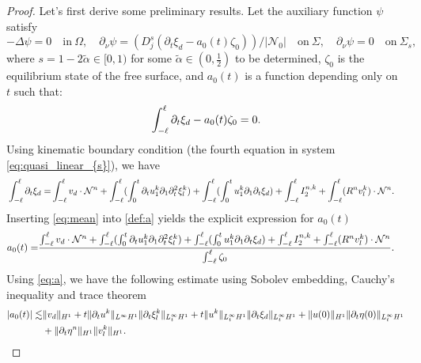 \documentclass[letterpaper,reqno,10pt,twoside]{amsart}
\theoremstyle{definition}
\theoremstyle{remark}
\def\p{\partial}
\def\no{\nonumber}
\def\Om{\Omega}
\begin{document}
\begin{proof}
		Let's first derive some preliminary results. Let the auxiliary function $\psi$ satisfy
		\begin{equation}\label{def:psi}
			-\Delta\psi=0 \quad \text{in} \ \Om,\quad \p_{\nu}\psi=(D_j^s(\partial_{t}\xi_{d}-a_{0}(t)\zeta_{0}))/|\mathcal{N}_0| \quad \text{on} \ \Sigma,\quad \p_{\nu}\psi=0 \quad \text{on} \ \Sigma_s,
		\end{equation}
		where $s=1-2\tilde{\alpha}\in [0,1)$ for some $\tilde{\alpha}\in (0,\frac{1}{2})$ to be determined, 
		$\zeta_{0}$ is the equilibrium state of the free surface, and $a_{0}(t)$ is a function depending only on $t$ such that:
		\begin{align}{\label{def:a}}
			\int_{-\ell}^{\ell} \p_{t}\xi_{d}- a_{0}(t)\zeta_{0} =0.
		\end{align}
		\noindent Using kinematic boundary condition (the fourth equation in system \eqref{eq:quasi_linear_{s}}), we have
		\begin{align}{\label{eq:mean}}
			\int_{-\ell}^{\ell}\p_{t}\xi_{d}=&\int_{-\ell}^{\ell}v_{d}\cdot \mathcal{N}^{n} +\int_{-\ell}^{\ell}(\int_{0}^{t}\p_{t}u_{1}^{k}\p_{1}\p_{t}^{2}\xi_{l}^{k} )  +\int_{-\ell}^{\ell}(\int_{0}^{t}u_{1}^{k}\p_{1}\p_{t}\xi_{d} )  +\int_{-\ell}^{\ell} I^{n,k}_{2} +\int_{-\ell}^{\ell} (R^{n}v_{l}^{k})\cdot \mathcal{N}^{n}.
		\end{align}
		Inserting \eqref{eq:mean} into \eqref{def:a} yields the explicit expression for $a_{0}(t)$
		\begin{align}{\label{eq:a}}
			\begin{aligned}
				a_{0}(t)=&\frac{\int_{-\ell}^{\ell}v_{d}\cdot \mathcal{N}^{n} +\int_{-\ell}^{\ell}(\int_{0}^{t}\p_{t}u_{1}^{k}\p_{1}\p_{t}^{2}\xi_{l}^{k} )  +\int_{-\ell}^{\ell}(\int_{0}^{t}u_{1}^{k}\p_{1}\p_{t}\xi_{d})  +\int_{-\ell}^{\ell} I^{n,k}_{2} +\int_{-\ell}^{\ell} (R^{n}v_{l}^{k})\cdot \mathcal{N}^{n}}{\int_{-\ell}^{\ell}\zeta_{0}}.
			\end{aligned}
		\end{align}
		\noindent Using \eqref{eq:a}, we have the following estimate using Sobolev embedding, Cauchy's inequality and trace theorem
		\begin{align}{\label{eq:bdd_a_1}}
			|a_{0}(t)|\lesssim&\|v_{d}\|_{H^{1}}+t\|\p_{t}u^{k}\|_{L^{\infty}H^{1}}\|\p_{t}\xi_{l}^{k}\|_{L_{t}^{\infty}H^{1}}+t\|u^{k}\|_{L_{t}^{\infty}H^{1}}\|\p_{t}\xi_{d}\|_{L_{t}^{\infty}H^{1}}+\|u(0)\|_{H^{1}}\|\p_{t}\eta(0)\|_{L_{t}^{\infty}H^{1}}\\
			&+\|\p_{t}\eta^{n}\|_{H^{1}}\|v_{l}^{k}\|_{H^{1}}. \no

\end{align}
\end{proof}
\end{document}
